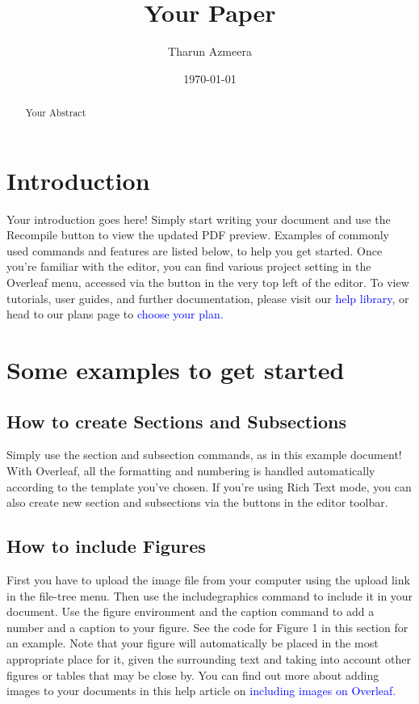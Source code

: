 \documentclass{article}
\title{Your Paper}
\author{Tharun Azmeera}
\date{\today}
\begin{document}
	\maketitle
	
	\begin{abstract}
		Your Abstract
	\end{abstract}

\section{Introduction}
Your introduction goes here! Simply start writing your document and use the Recompile button to
view the updated PDF preview. Examples of commonly used commands and features are listed below,
to help you get started.
Once you’re familiar with the editor, you can find various project setting in the Overleaf menu,
accessed via the button in the very top left of the editor. To view tutorials, user guides, and further
documentation, please visit our {\textcolor{blue}{help library}}, or head to our plans page to {\textcolor{blue}{choose your plan.}}


\section{Some examples to get started}
\subsection{How to create Sections and Subsections}
Simply use the section and subsection commands, as in this example document! With Overleaf, all
the formatting and numbering is handled automatically according to the template you’ve chosen. If
you’re using Rich Text mode, you can also create new section and subsections via the buttons in the
editor toolbar.

\subsection{How to include Figures}
First you have to upload the image file from your computer using the upload link in the file-tree menu.
Then use the includegraphics command to include it in your document. Use the figure environment
and the caption command to add a number and a caption to your figure. See the code for Figure 1 in
this section for an example.
Note that your figure will automatically be placed in the most appropriate place for it, given the
surrounding text and taking into account other figures or tables that may be close by. You can find
out more about adding images to your documents in this help article on {\textcolor{blue}{including images on Overleaf.}}
\end{document}
